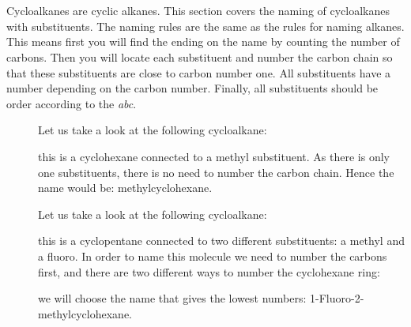 \documentclass[main.tex]{subfiles}
\begin{document}
\section{\color{blue!30!black}{Cylcoalkanes with substituyents}}
Cycloalkanes are cyclic alkanes. This section covers the naming of cycloalkanes with substituents. The naming rules are the same as the rules for naming alkanes. This means first you will find the ending on the name by counting the number of carbons. Then you will locate each substituent and number the carbon chain so that these substituents are close to carbon number one. All substituents have a number depending on the carbon number. Finally, all substituents should be order according to the \emph{abc}.
\sloppy
\begin{description}
\item[] Let us take a look at the following cycloalkane:
\begin{center} \end{center}
this is a cyclohexane connected to a methyl substituent. As there is only one substituents, there is no need to number the carbon chain. Hence the name would be: methylcyclohexane.

\item[] Let us take a look at the following cycloalkane:
\begin{center} \end{center}
this is a cyclopentane connected to two different substituents: a methyl and a fluoro. In order to name this molecule we need to number the carbons first, and there are two different ways to number the cyclohexane ring:
\A{(-[,-0.3,,,draw=none]\textcolor{red}{1})}
\B{(-[,-0.3,,,draw=none]\textcolor{red}{2})}
\C{(-[,-0.3,,,draw=none]\textcolor{red}{3})}
\D{(-[,-0.3,,,draw=none]\textcolor{red}{4})}
\E{(-[,-0.3,,,draw=none]\textcolor{red}{5})}
\F{(-[,-0.3,,,draw=none]\textcolor{red}{6})}
\newcommand\X[1]{(-[,-0.3,,,draw=none]{#1})}

\begin{center}
\hspace{4.5cm}
\end{center}
we will choose the name that gives the lowest numbers: 1-Fluoro-2-methylcyclohexane.





\end{description}
\end{document}
